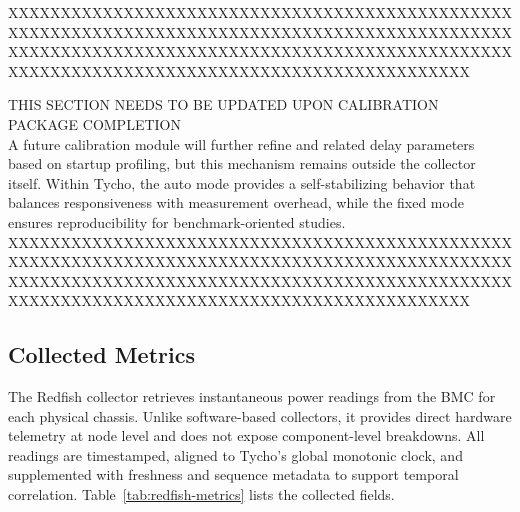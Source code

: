 XXXXXXXXXXXXXXXXXXXXXXXXXXXXXXXXXXXXXXXXXXXXXXXXXXXXXXXXXXXXXXXXXXXXXXXXXXXXXXXXXXXXXXXXXXXXXXXXXXXXXXXXXXXXXXXXXXXXXXXXXXXXXXXXXXXXXXXXXXXXXXXXXXXXXXXXXXXXXXXXXXXXXXXXXXXXXXXXXXXXXXXXXXXX

THIS SECTION NEEDS TO BE UPDATED UPON CALIBRATION PACKAGE COMPLETION\\
A future calibration module will further refine  and related delay parameters based on startup profiling, but this mechanism remains outside the collector itself.  
Within Tycho, the auto mode provides a self-stabilizing behavior that balances responsiveness with measurement overhead, while the fixed mode ensures reproducibility for benchmark-oriented studies.
XXXXXXXXXXXXXXXXXXXXXXXXXXXXXXXXXXXXXXXXXXXXXXXXXXXXXXXXXXXXXXXXXXXXXXXXXXXXXXXXXXXXXXXXXXXXXXXXXXXXXXXXXXXXXXXXXXXXXXXXXXXXXXXXXXXXXXXXXXXXXXXXXXXXXXXXXXXXXXXXXXXXXXXXXXXXXXXXXXXXXXXXXXXX


\subsection{Collected Metrics}
\label{subsec:redfish_metrics}

The Redfish collector retrieves instantaneous power readings from the BMC for each physical chassis.  
Unlike software-based collectors, it provides direct hardware telemetry at node level and does not expose component-level breakdowns.  
All readings are timestamped, aligned to Tycho’s global monotonic clock, and supplemented with freshness and sequence metadata to support temporal correlation.  
Table~\ref{tab:redfish-metrics} lists the collected fields.

